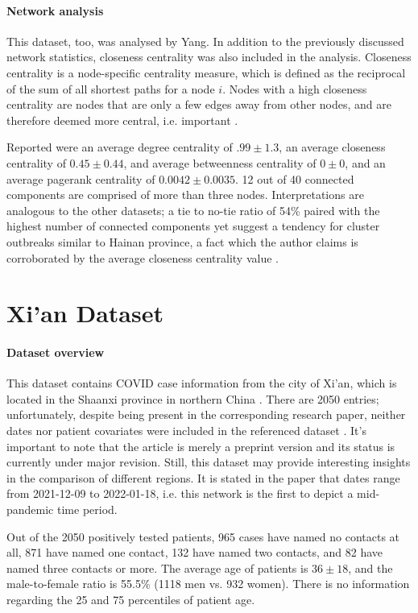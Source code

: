 \paragraph{Network analysis} This dataset, too, was analysed by Yang. In addition to the previously discussed network statistics, closeness centrality was also included in the analysis. Closeness centrality is a node-specific centrality measure, which is defined as the reciprocal of the sum of all shortest paths for a node $i$. Nodes with a high closeness centrality are nodes that are only a few edges away from other nodes, and are therefore deemed more central, i.e. important \cite{sabidussi1966centrality}. 

Reported were an average degree centrality of $.99\pm1.3$, an average closeness centrality of $0.45\pm0.44$, and average betweenness centrality of $0\pm0$, and an average pagerank centrality of $0.0042\pm0.0035$. 12 out of 40 connected components are comprised of more than three nodes. Interpretations are analogous to the other datasets; a tie to no-tie ratio of 54\% paired with the highest number of connected components yet suggest a tendency for cluster outbreaks similar to Hainan province, a fact which the author claims is corroborated by the average closeness centrality value \cite{shaanxi_publication}.

\section{Xi'an Dataset}
\label{sec:xian_data}

\paragraph{Dataset overview} This dataset contains COVID case information from the city of Xi'an, which is located in the Shaanxi province in northern China \cite{xian_data}. There are 2050 entries; unfortunately, despite being present in the corresponding research paper, neither dates nor patient covariates were included in the referenced dataset \cite{xian_publication,xian_data}. It's important to note that the article is merely a preprint version and its status is currently under major revision. Still, this dataset may provide interesting insights in the comparison of different regions. It is stated in the paper that dates range from 2021-12-09 to 2022-01-18, i.e. this network is the first to depict a mid-pandemic time period. 

Out of the 2050 positively tested patients, 965 cases have named no contacts at all, 871 have named one contact, 132 have named two contacts, and 82 have named three contacts or more. The average age of patients is $36\pm18$, and the male-to-female ratio is 55.5\% (1118 men vs. 932 women). There is no information regarding the 25 and 75 percentiles of patient age. 

